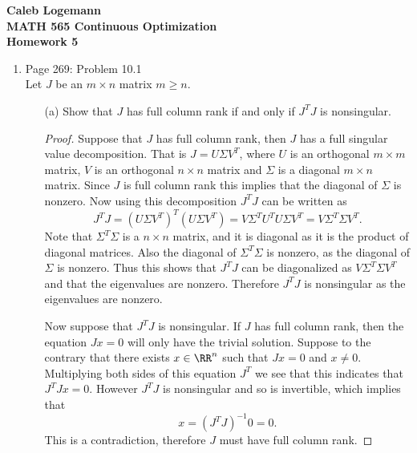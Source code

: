 \documentclass[11pt, oneside]{article}
\begin{document}
\noindent \textbf{\Large{Caleb Logemann \\
MATH 565 Continuous Optimization \\
Homework 5
}}

%
\begin{enumerate}
  \item %
    Page 269: Problem 10.1 \\
    Let $J$ be an $m \times n$ matrix $m \ge n$.
    \begin{enumerate}
      \item[(a)] %
        Show that $J$ has full column rank if and only if $J^T J$ is nonsingular.

        \begin{proof}
          Suppose that $J$ has full column rank, then $J$ has a full singular
          value decomposition.
          That is $J = U \Sigma V^T$, where $U$ is an orthogonal $m \times m$
          matrix, $V$ is an orthogonal $n \times n$ matrix and $\Sigma$ is a
          diagonal $m \times n$ matrix.
          Since $J$ is full column rank this implies that the diagonal of
          $\Sigma$ is nonzero.
          Now using this decomposition $J^T J$ can be written as
          \[
            J^T J = (U \Sigma V^T)^T (U \Sigma V^T) = V \Sigma^T U^T U \Sigma V^T = V \Sigma^T \Sigma V^T.
          \]
          Note that $\Sigma^T \Sigma$ is a $n \times n$ matrix, and it is
          diagonal as it is the product of diagonal matrices.
          Also the diagonal of $\Sigma^T \Sigma$ is nonzero, as the diagonal of
          $\Sigma$ is nonzero.
          Thus this shows that $J^T J$ can be diagonalized as
          $V \Sigma^T \Sigma V^T$ and that the eigenvalues are nonzero.
          Therefore $J^T J$ is nonsingular as the eigenvalues are nonzero.

          Now suppose that $J^T J$ is nonsingular.
          If $J$ has full column rank, then the equation $Jx = 0$ will only
          have the trivial solution.
          Suppose to the contrary that there exists $x \in \RR^n$ such that
          $Jx = 0$ and $x \neq 0$.
          Multiplying both sides of this equation $J^T$ we see that this
          indicates that $J^T J x = 0$.
          However $J^T J$ is nonsingular and so is invertible, which implies
          that
          \[
            x = (J^T J)^{-1} 0 = 0.
          \]
          This is a contradiction, therefore $J$ must have full column rank.
        \end{proof}


\end{enumerate}
\end{enumerate}
\end{document}
